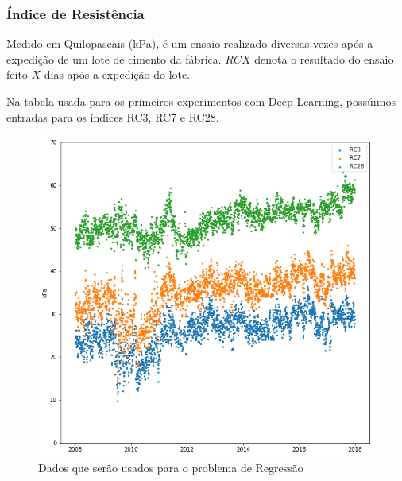 \documentclass{beamer}
\begin{document}
\begin{frame}
  \frametitle{Índice de Resistência}
Medido em Quilopascais (kPa), é um ensaio realizado diversas vezes após a
expedição de um lote de cimento da fábrica. $RCX$ denota o resultado do ensaio feito $X$ dias
após a expedição do lote. \\
\bigskip

Na tabela usada para os primeiros experimentos com Deep Learning, possúimos
entradas para os índices RC3, RC7 e RC28. \\

  
\end{frame}

\begin{frame}
\begin{figure}[H]
\centering
\includegraphics[scale=0.4]{slides_dados}
\caption{Dados que serão usados para o problema de Regressão}
\end{figure}

\end{frame}
\end{document}

